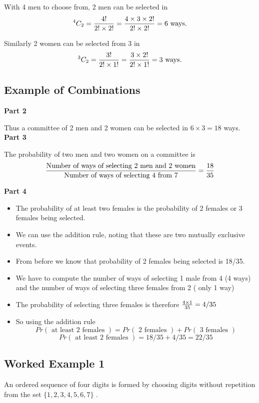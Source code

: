 \documentclass[]{report}
\begin{document}
With 4 men to choose from, 2 men can be selected in \[
^4 C_2  = {4!  \over 2! \times 2!} =  {4 \times 3 \times 2!  \over 2! \times 2!} = 6\mbox{ ways.}
\]

Similarly 2 women can be selected from 3 in
\[
^3 C_2  = {3!  \over 2! \times1!} =  {3 \times 2!  \over 2! \times 1!} = 3\mbox{ ways.}
\]

{
\subsection{Example of Combinations}
	
	\textbf{Part 2}
	
	Thus a committee of 2 men and 2 women can be selected in $ 6 \times 3  = 18 $ ways.\\
	\bigskip
	\textbf{Part 3}
	
	The probability of two men and two women on a committee is
	\[ {\mbox{Number of ways of selecting 2 men and 2 women} \over \mbox{Number of ways of selecting 4 from 7}} = {18 \over 35 }\]
	
	
	
	\textbf{Part 4}
	\begin{itemize}
		\item The probability of at least two females is the probability of 2 females or 3 females being selected.
		\item We can use the addition rule, noting that these are two mutually exclusive events.
		\item From before we know that probability of 2 females being selected is 18/35.
		\item We have to compute the number of ways of selecting 1 male from 4 (4 ways) and the number of ways of selecting three females from 2 ( only 1 way)
		\item The probability of selecting three females is therefore ${4 \times 1 \over 35} = 4/35$
		\item So using the addition rule
		\[ Pr(\mbox{ at least 2 females }) = Pr(\mbox{ 2 females }) + Pr(\mbox{ 3 females }) \]
		\[ Pr(\mbox{ at least 2 females })  = 18/35 + 4/35 = 22/35 \]
	\end{itemize}
	
}


\subsection{Worked Example 1}
An ordered sequence of four digits is formed by choosing digits without
repetition from the set $\{1, 2, 3, 4, 5, 6, 7\}$ .
\end{document}
